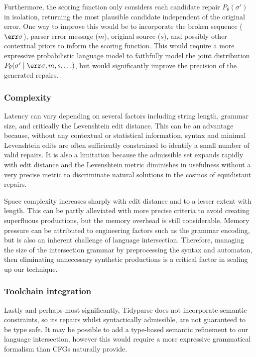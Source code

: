 \documentclass[runningheads]{llncs}
\begin{document}
  Furthermore, the scoring function only considers each candidate repair $P_\theta(\sigma')$ in isolation, returning the most plausible candidate independent of the original error. One way to improve this would be to incorporate the broken sequence ($\err\sigma$), parser error message ($m$), original source ($s$), and possibly other contextual priors to inform the scoring function. This would require a more expressive probabilistic language model to faithfully model the joint distribution $P_\theta(\sigma' \mid \err\sigma, m, s, \ldots)$, but would significantly improve the precision of the generated repairs.

  \subsubsection{Complexity}

  Latency can vary depending on several factors including string length, grammar size, and critically the Levenshtein edit distance. This can be an advantage because, without any contextual or statistical information, syntax and minimal Levenshtein edits are often sufficiently constrained to identify a small number of valid repairs. It is also a limitation because the admissible set expands rapidly with edit distance and the Levenshtein metric diminishes in usefulness without a very precise metric to discriminate natural solutions in the cosmos of equidistant repairs.

  Space complexity increases sharply with edit distance and to a lesser extent with length. This can be partly alleviated with more precise criteria to avoid creating superfluous productions, but the memory overhead is still considerable. Memory pressure can be attributed to engineering factors such as the grammar encoding, but is also an inherent challenge of language intersection. Therefore, managing the size of the intersection grammar by preprocessing the syntax and automaton, then eliminating unnecessary synthetic productions is a critical factor in scaling up our technique.

  \subsubsection{Toolchain integration}

  Lastly and perhaps most significantly, Tidyparse does not incorporate semantic constraints, so its repairs whilst syntactically admissible, are not guaranteed to be type safe. It may be possible to add a type-based semantic refinement to our language intersection, however this would require a more expressive grammatical formalism than CFGs naturally provide.
\end{document}
